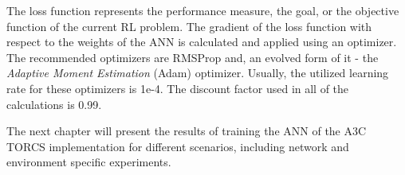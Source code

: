 The loss function represents the performance measure, the goal, or the objective function of the current RL problem. The gradient of the loss function with respect to the weights of the ANN is calculated and applied using an optimizer. The recommended optimizers are RMSProp and, an evolved form of it - the \textit{Adaptive Moment Estimation} (Adam) optimizer. Usually, the utilized learning rate for these optimizers is 1e-4. The discount factor used in all of the calculations is 0.99.

The next chapter will present the results of training the ANN of the A3C TORCS implementation for different scenarios, including network and environment specific experiments.